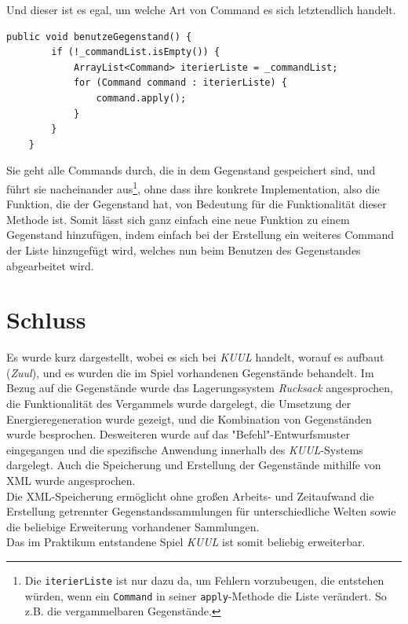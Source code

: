 \documentclass[12pt,twoside]{article}
\theoremstyle{plain}
\theoremstyle{definition}
\theoremstyle{remark}
\begin{document}
Und dieser ist es egal, um welche Art von Command es sich letztendlich handelt.
\begin{lstlisting}[caption=die benutzeGegenstand-Methode aus der Klasse Gegenstand, label=code:main_gegenstand]
	public void benutzeGegenstand() {
		if (!_commandList.isEmpty()) {
			ArrayList<Command> iterierListe = _commandList;
			for (Command command : iterierListe) {
				command.apply();
			}
		}
	}
\end{lstlisting}
Sie geht alle Commands durch, die in dem Gegenstand gespeichert sind, und führt sie nacheinander aus\footnote{Die \texttt{iterierListe} ist nur dazu da, um Fehlern vorzubeugen, die entstehen würden, wenn ein \texttt{Command} in seiner \texttt{apply}-Methode die Liste verändert. So z.B. die vergammelbaren Gegenstände.}, ohne dass ihre konkrete Implementation, also die Funktion, die der Gegenstand hat, von Bedeutung für die Funktionalität dieser Methode ist. Somit lässt sich ganz einfach eine neue Funktion zu einem Gegenstand hinzufügen, indem einfach bei der Erstellung ein weiteres Command der Liste hinzugefügt wird, welches nun beim Benutzen des Gegenstandes abgearbeitet wird.

\section{Schluss}
\label{sec:end}
Es wurde kurz dargestellt, wobei es sich bei \textit{KUUL} handelt, worauf es aufbaut (\textit{Zuul}), und es wurden die im Spiel vorhandenen Gegenstände behandelt.
Im Bezug auf die Gegenstände wurde das Lagerungssystem \textit{Rucksack} angesprochen, die Funktionalität des Vergammels wurde dargelegt, die Umsetzung der Energieregeneration wurde gezeigt, und die Kombination von Gegenständen wurde besprochen.
Desweiteren wurde auf das "Befehl\string"-Entwurfsmuster eingegangen und die spezifische Anwendung innerhalb des \textit{KUUL}-Systems dargelegt.
Auch die Speicherung und Erstellung der Gegenstände mithilfe von XML wurde angesprochen.\\
Die XML-Speicherung ermöglicht ohne großen Arbeits- und Zeitaufwand die Erstellung getrennter Gegenstandssammlungen für unterschiedliche Welten sowie die beliebige Erweiterung vorhandener Sammlungen.\\
Das im Praktikum entstandene Spiel \textit{KUUL} ist somit beliebig erweiterbar.
\end{document}
